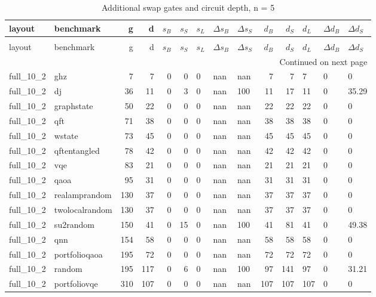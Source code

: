 \begin{longtable}{llrrrrlllrrlll}
\caption{Additional swap gates and circuit depth, n = 5} \label{benchmark-table-5} \\
\toprule
layout & benchmark & g & d & $s_B$ & $s_S$ & $s_L$ & $\Delta s_B$ & $\Delta s_S$ & $d_B$ & $d_S$ & $d_L$ & $\Delta d_B$ & $\Delta d_S$ \\
\midrule
\endfirsthead
\caption[]{Additional swap gates and circuit depth, n = 5} \\
\toprule
layout & benchmark & g & d & $s_B$ & $s_S$ & $s_L$ & $\Delta s_B$ & $\Delta s_S$ & $d_B$ & $d_S$ & $d_L$ & $\Delta d_B$ & $\Delta d_S$ \\
\midrule
\endhead
\midrule
\multicolumn{14}{r}{Continued on next page} \\
\midrule
\endfoot
\bottomrule
\endlastfoot
full\_10\_2 & ghz & 7 & 7 & 0 & 0 & 0 & nan & nan & 7 & 7 & 7 & 0 & 0 \\
full\_10\_2 & dj & 36 & 11 & 0 & 3 & 0 & nan & 100 & 11 & 17 & 11 & 0 & 35.29 \\
full\_10\_2 & graphstate & 50 & 22 & 0 & 0 & 0 & nan & nan & 22 & 22 & 22 & 0 & 0 \\
full\_10\_2 & qft & 71 & 38 & 0 & 0 & 0 & nan & nan & 38 & 38 & 38 & 0 & 0 \\
full\_10\_2 & wstate & 73 & 45 & 0 & 0 & 0 & nan & nan & 45 & 45 & 45 & 0 & 0 \\
full\_10\_2 & qftentangled & 78 & 42 & 0 & 0 & 0 & nan & nan & 42 & 42 & 42 & 0 & 0 \\
full\_10\_2 & vqe & 83 & 21 & 0 & 0 & 0 & nan & nan & 21 & 21 & 21 & 0 & 0 \\
full\_10\_2 & qaoa & 95 & 31 & 0 & 0 & 0 & nan & nan & 31 & 31 & 31 & 0 & 0 \\
full\_10\_2 & realamprandom & 130 & 37 & 0 & 0 & 0 & nan & nan & 37 & 37 & 37 & 0 & 0 \\
full\_10\_2 & twolocalrandom & 130 & 37 & 0 & 0 & 0 & nan & nan & 37 & 37 & 37 & 0 & 0 \\
full\_10\_2 & su2random & 150 & 41 & 0 & 15 & 0 & nan & 100 & 41 & 81 & 41 & 0 & 49.38 \\
full\_10\_2 & qnn & 154 & 58 & 0 & 0 & 0 & nan & nan & 58 & 58 & 58 & 0 & 0 \\
full\_10\_2 & portfolioqaoa & 195 & 72 & 0 & 0 & 0 & nan & nan & 72 & 72 & 72 & 0 & 0 \\
full\_10\_2 & random & 195 & 117 & 0 & 6 & 0 & nan & 100 & 97 & 141 & 97 & 0 & 31.21 \\
full\_10\_2 & portfoliovqe & 310 & 107 & 0 & 0 & 0 & nan & nan & 107 & 107 & 107 & 0 & 0 \\

\end{longtable}
